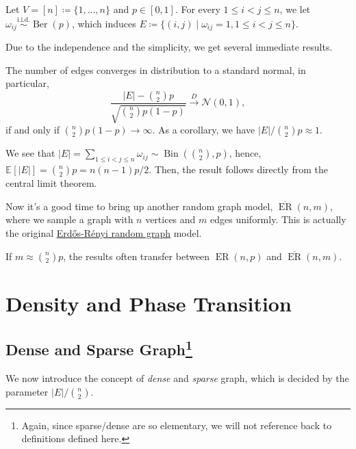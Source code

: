 \begin{prev}
	Let \(V = [n] \coloneqq \{ 1, \dots , n \} \) and \(p \in [0, 1]\). For every \(1 \leq i < j \leq n\), we let \(\omega _{ij} \overset{\text{i.i.d.} }{\sim } \operatorname{Ber}(p) \), which induces \(E \coloneqq \{ (i, j) \mid \omega _{ij} = 1, 1 \leq i < j \leq n\} \).
\end{prev}

Due to the independence and the simplicity, we get several immediate results.

\begin{claim}
	The number of edges converges in distribution to a standard normal, in particular,
	\[
		\frac{\lvert E \rvert - \binom{n}{2}p}{\sqrt{\binom{n}{2}p (1 - p)} }
		\overset{D}{\to } \mathcal{N} (0, 1),
	\]
	if and only if \(\binom{n}{2}p (1 - p) \to \infty \). As a corollary, we have \(\lvert E \rvert / \binom{n}{2}p \approx 1\).
\end{claim}
\begin{explanation}
	We see that \(\lvert E \rvert = \sum_{1 \leq i < j \leq n} \omega _{ij} \sim \operatorname{Bin}(\binom{n}{2}, p) \), hence, \(\mathbb{E}_{}[\lvert E \rvert ] = \binom{n}{2}p = n(n-1) p / 2\). Then, the result follows directly from the central limit theorem.
\end{explanation}

Now it's a good time to bring up another random graph model, \(\overline{\operatorname{ER}} (n, m)\), where we sample a graph with \(n\) vertices and \(m\) edges uniformly. This is actually the original \hyperref[def:Erdős-Rényi-random-graph]{Erdős-Rényi random graph} model.

\begin{remark}
	If \(m \approx \binom{n}{2}p\), the results often transfer between \(\operatorname{ER}(n, p)\) and \(\overline{\operatorname{ER}} (n, m)\).
\end{remark}

\section{Density and Phase Transition}
\subsection{Dense and Sparse Graph\protect\footnote{Again, since sparse/dense are so elementary, we will not reference back to definitions defined here.}}
We now introduce the concept of \emph{dense} and \emph{sparse} graph, which is decided by the parameter \(\lvert E \rvert / \binom{n}{2} \).

